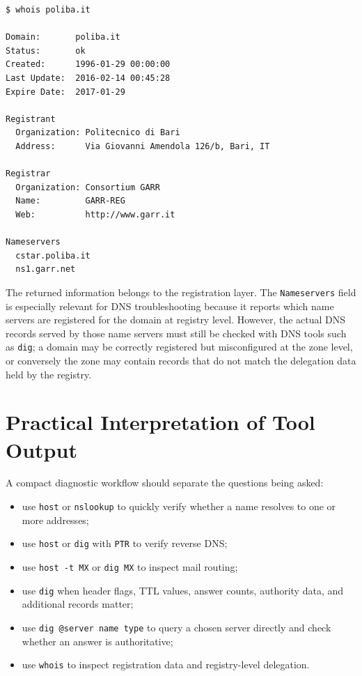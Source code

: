 \documentclass{scrbook}
\begin{document}
	\begin{lstlisting}
$ whois poliba.it

Domain:       poliba.it
Status:       ok
Created:      1996-01-29 00:00:00
Last Update:  2016-02-14 00:45:28
Expire Date:  2017-01-29

Registrant
  Organization: Politecnico di Bari
  Address:      Via Giovanni Amendola 126/b, Bari, IT
	
Registrar
  Organization: Consortium GARR
  Name:         GARR-REG
  Web:          http://www.garr.it

Nameservers
  cstar.poliba.it
  ns1.garr.net
	\end{lstlisting}
	
	The returned information belongs to the registration layer. The \texttt{Nameservers} field is especially relevant for DNS troubleshooting because it reports which name servers are registered for the domain at registry level. However, the actual DNS records served by those name servers must still be checked with DNS tools such as \texttt{dig}; a domain may be correctly registered but misconfigured at the zone level, or conversely the zone may contain records that do not match the delegation data held by the registry.
	
	\section{Practical Interpretation of Tool Output}
	
	A compact diagnostic workflow should separate the questions being asked:
	\begin{itemize}
	    \item use \texttt{host} or \texttt{nslookup} to quickly verify whether a name resolves to one or more addresses;
	    \item use \texttt{host} or \texttt{dig} with \texttt{PTR} to verify reverse DNS;
	    \item use \texttt{host -t MX} or \texttt{dig MX} to inspect mail routing;
	    \item use \texttt{dig} when header flags, TTL values, answer counts, authority data, and additional records matter;
	    \item use \texttt{dig @server name type} to query a chosen server directly and check whether an answer is authoritative;
	    \item use \texttt{whois} to inspect registration data and registry-level delegation.
	\end{itemize}
	
\end{document}
